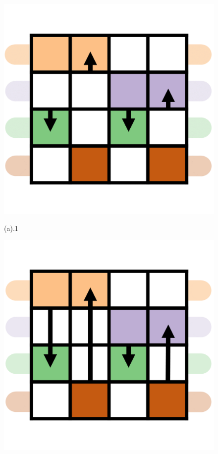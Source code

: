 \documentclass[review,journal]{vgtc}         %
\begin{document}
\begin{figure}[h]
	\vspace{-0.5em}
	\begin{minipage}{0.24\linewidth}
		\centerline{\includegraphics[width=\textwidth]{Fig/11.png}}
		\vspace{-1pt}
		\centerline{(a).1}
		\centerline{\includegraphics[width=\textwidth]{Fig/12.png}}

\end{minipage}
\end{figure}
\end{document}
